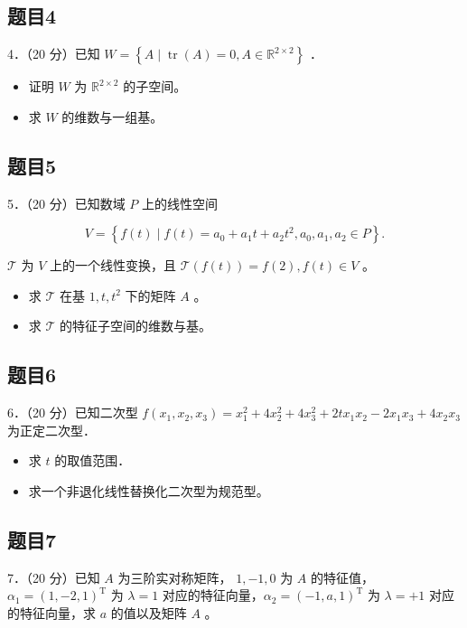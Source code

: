 \documentclass{article}
\begin{document}
\subsection{题目4}
4．（20 分）已知 \(W=\left\{A \mid \operatorname{tr}(A)=0, A \in \mathbb{R}^{2 \times 2}\right\}\) ．

\begin{itemize}
  \item[（1）] 证明 \(W\) 为 \(\mathbb{R}^{2 \times 2}\) 的子空间。
  \item[（2）] 求 \(W\) 的维数与一组基。
\end{itemize}

\subsection{题目5}
5．（20 分）已知数域 \(P\) 上的线性空间

\[
V=\left\{f(t) \mid f(t)=a_{0}+a_{1} t+a_{2} t^{2}, a_{0}, a_{1}, a_{2} \in P\right\} .
\]

\(\mathcal{T}\) 为 \(V\) 上的一个线性变换，且 \(\mathcal{T}(f(t))=f(2), f(t) \in V\) 。

\begin{itemize}
  \item[（1）] 求 \(\mathcal{T}\) 在基 \(1, t, t^{2}\) 下的矩阵 \(A\) 。
  \item[（2）] 求 \(\mathcal{T}\) 的特征子空间的维数与基。
\end{itemize}

\subsection{题目6}
6．（20 分）已知二次型 \(f\left(x_{1}, x_{2}, x_{3}\right)=x_{1}^{2}+4 x_{2}^{2}+4 x_{3}^{2}+2 t x_{1} x_{2}-2 x_{1} x_{3}+4 x_{2} x_{3}\) 为正定二次型．

\begin{itemize}
  \item[（1）] 求 \(t\) 的取值范围．
  \item[（2）] 求一个非退化线性替换化二次型为规范型。
\end{itemize}

\subsection{题目7}
7．（20 分）已知 \(A\) 为三阶实对称矩阵， \(1,-1,0\) 为 \(A\) 的特征值，\(\alpha_{1}=(1,-2,1)^{\mathrm{T}}\) 为 \(\lambda=1\) 对应的特征向量，\(\alpha_{2}=(-1, a, 1)^{\mathrm{T}}\) 为 \(\lambda=+1\) 对应的特征向量，求 \(a\) 的值以及矩阵 \(A\) 。
\end{document}
